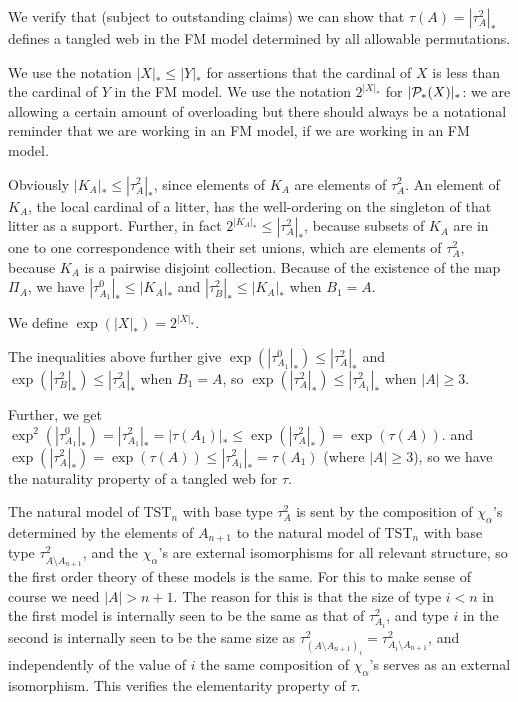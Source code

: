\documentclass[12pt]{article}
\begin{document}
We verify that (subject to outstanding claims) we can show that $\tau(A) = |\tau^2_A|_*$ defines a tangled web in the FM model determined by all allowable permutations. 

We use the notation $|X|_* \leq |Y|_*$ for assertions that the cardinal of $X$ is less than the cardinal of $Y$ in the FM model.  We use the notation $2^{|X|_*}$ for $|{\cal P}_*(X)|_*$:  we are allowing a certain amount of overloading but there should always be a notational reminder that we are working in an FM model, if we are working in an FM model.

Obviously $|K_A|_* \leq |\tau^2_A|_*$, since elements of $K_A$ are elements of $\tau^2_A$.  An element of $K_A$, the local cardinal of a litter, has the well-ordering on the singleton of that litter
as a support.  Further, in fact $2^{|K_A|_*} \leq |\tau^2_A|_*$, because subsets of $K_A$ are in one to one correspondence with their set unions, which are elements of
$\tau^2_A$, because $K_A$ is a pairwise disjoint collection.  Because of the existence of the map $\Pi_A$, we have $|\tau^0_{A_1}|_* \leq |K_A|_*$ and
$|\tau^2_B|_* \leq |K_A|_*$ when $B_1=A$.  

We define $\exp(|X|_*) = 2^{|X|_*}$.

The inequalities above further give $\exp(|\tau^0_{A_1}|_*) \leq |\tau^2_A|_*$ and $\exp(|\tau^2_B|_*) \leq |\tau^2_A|_*$ when $B_1=A$, so $\exp(|\tau^2_{A}|_*) \leq |\tau^2_{A_1}|_*$ when $|A|\geq 3$.

Further, we get $\exp^2(|\tau^0_{A_1}|_*) = |\tau^2_{A_1}|_* = |\tau(A_1)|_* \leq \exp(|\tau^2_A|_*) = \exp(\tau(A))$.
and $\exp(|\tau^2_{A}|_*) = \exp(\tau(A)) \leq |\tau^2_{A_1}|_* = \tau(A_1)$ (where $|A| \geq 3$), so we have the naturality property of a tangled web for $\tau$.

The natural model of TST$_n$ with base type $\tau^2_A$ is sent by the composition of $\chi_\alpha$'s determined by the elements of $A_{n+1}$
to the natural model of TST$_n$ with base type $\tau^2_{A \setminus A_{n+1}}$, and the $\chi_\alpha$'s are external isomorphisms for all relevant structure, so the first order theory of these models is the same.  For this to make sense of course we need $|A| > n+1$.
The reason for this is that the size of type $i<n$ in the first model is internally seen to be the same as that of $\tau^2_{A_i}$, and type $i$ in the  second is internally seen to be the same size
as  $\tau^2_{(A \setminus A_{n+1})_i} = \tau^2_{A_i \setminus A_{n+1}}$, and independently of the value of $i$ the same composition of $\chi_\alpha$'s serves as an external isomorphism.
This verifies the elementarity property of $\tau$.
\end{document}
